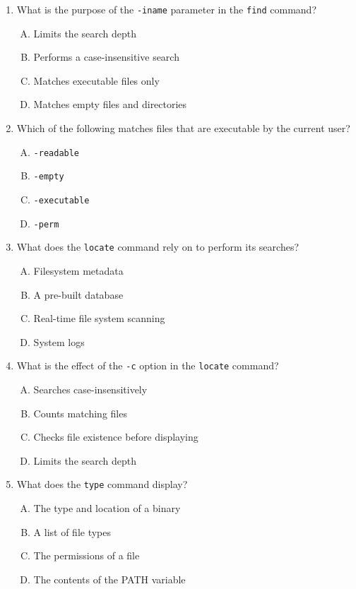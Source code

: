 \documentclass[a4paper]{report}
\begin{document}
\begin{enumerate}[1.]
    \item What is the purpose of the \texttt{-iname} parameter in the \texttt{find} command?  
    \begin{enumerate}[A)]
        \item Limits the search depth  
        \item Performs a case-insensitive search  
        \item Matches executable files only  
        \item Matches empty files and directories  
    \end{enumerate}

    \item Which of the following matches files that are executable by the current user?  
    \begin{enumerate}[A)]
        \item \texttt{-readable}  
        \item \texttt{-empty}  
        \item \texttt{-executable}  
        \item \texttt{-perm}  
    \end{enumerate}

    \item What does the \texttt{locate} command rely on to perform its searches?  
    \begin{enumerate}[A)]
        \item Filesystem metadata  
        \item A pre-built database  
        \item Real-time file system scanning  
        \item System logs  
    \end{enumerate}

    \item What is the effect of the \texttt{-c} option in the \texttt{locate} command?  
    \begin{enumerate}[A)]
        \item Searches case-insensitively  
        \item Counts matching files  
        \item Checks file existence before displaying  
        \item Limits the search depth  
    \end{enumerate}

    \item What does the \texttt{type} command display?  
    \begin{enumerate}[A)]
        \item The type and location of a binary  
        \item A list of file types  
        \item The permissions of a file  
        \item The contents of the PATH variable  
    \end{enumerate}


\end{enumerate}
\end{document}
